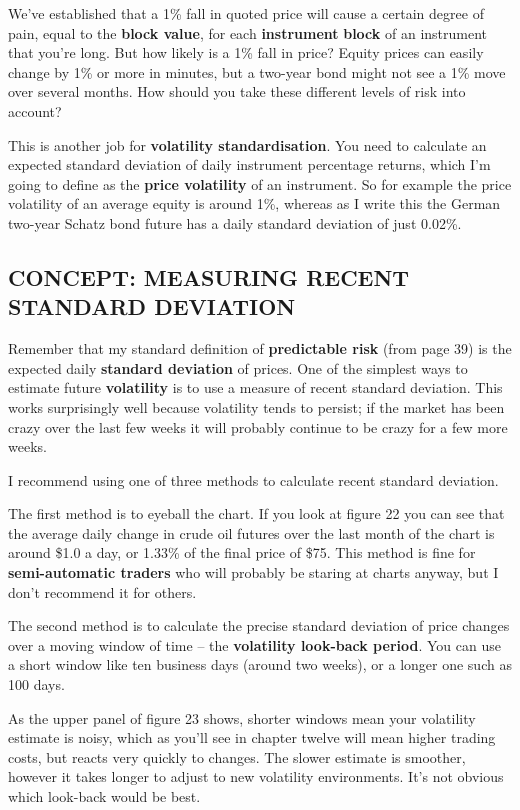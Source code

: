 We've established that a 1\% fall in quoted price will cause a certain degree of pain, equal to the \textbf{block value}, for each \textbf{instrument} \textbf{block} of an instrument that you're long. But how likely is a 1\% fall in price? Equity prices can easily change by 1\% or more in minutes, but a two-year bond might not see a 1\% move over several months. How should you take these different levels of risk into account?

This is another job for \textbf{volatility standardisation}. You need to calculate an expected standard deviation of daily instrument percentage returns, which I'm going to define as the \textbf{price volatility} of an instrument. So for example the price volatility of an average equity is around 1\%, whereas as I write this the German two-year Schatz bond future has a daily standard deviation of just 0.02\%.

\subsection*{CONCEPT: MEASURING RECENT STANDARD DEVIATION}

Remember that my standard definition of \textbf{predictable risk} (from page 39) is the expected daily \textbf{standard deviation} of prices. One of the simplest ways to estimate future \textbf{volatility} is to use a measure of recent standard deviation. This works surprisingly well because volatility tends to persist; if the market has been crazy over the last few weeks it will probably continue to be crazy for a few more weeks.

I recommend using one of three methods to calculate recent standard deviation.

The first method is to eyeball the chart. If you look at figure 22 you can see that the average daily change in crude oil futures over the last month of the chart is around \$1.0 a day, or 1.33\% of the final price of \$75. This method is fine for \textbf{semi-automatic traders} who will probably be staring at charts anyway, but I don't recommend it for others.

The second method is to calculate the precise standard deviation of price changes over a moving window of time -- the \textbf{volatility look-back period}. You can use a short window like ten business days (around two weeks), or a longer one such as 100 days.

As the upper panel of figure 23 shows, shorter windows mean your volatility estimate is noisy, which as you'll see in chapter twelve will mean higher trading costs, but reacts very quickly to changes. The slower estimate is smoother, however it takes longer to adjust to new volatility environments. It's not obvious which look-back would be best.

